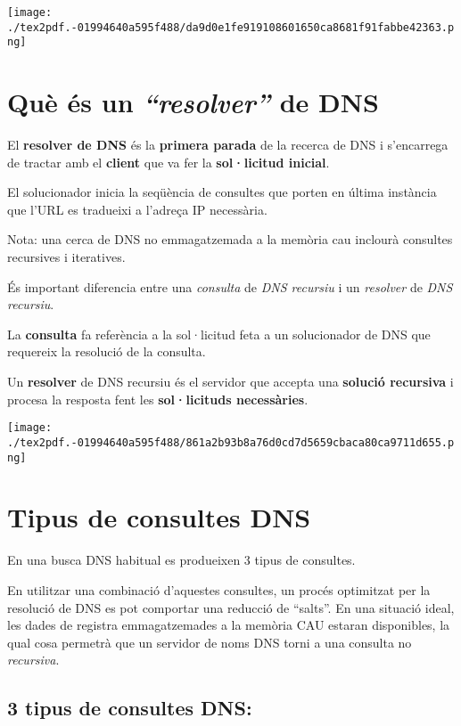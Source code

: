 \documentclass[]{article}
\begin{document}
\texttt{[image: ./tex2pdf.-01994640a595f488/da9d0e1fe919108601650ca8681f91fabbe42363.png]}

\hypertarget{quuxe8-uxe9s-un-resolver-de-dns}{%
\section{\texorpdfstring{\textbf{Què és un \emph{``resolver''} de
DNS}}{Què és un ``resolver'' de DNS}}\label{quuxe8-uxe9s-un-resolver-de-dns}}

El \textbf{resolver de DNS} és la \textbf{primera parada} de la recerca
de DNS i s'encarrega de tractar amb el \textbf{client} que va fer la
\textbf{sol·licitud inicial}.

El solucionador inicia la seqüència de consultes que porten en última
instància que l'URL es tradueixi a l'adreça IP necessària.

Nota: una cerca de DNS no emmagatzemada a la memòria cau inclourà
consultes recursives i iteratives.

És important diferencia entre una \emph{consulta} de \emph{DNS recursiu}
i un \emph{resolver} de \emph{DNS recursiu}.

La \textbf{consulta} fa referència a la sol·licitud feta a un
solucionador de DNS que requereix la resolució de la consulta.

Un \textbf{resolver} de DNS recursiu és el servidor que accepta una
\textbf{solució recursiva} i procesa la resposta fent les
\textbf{sol·licituds necessàries}.

\texttt{[image: ./tex2pdf.-01994640a595f488/861a2b93b8a76d0cd7d5659cbaca80ca9711d655.png]}

\hypertarget{tipus-de-consultes-dns}{%
\section{\texorpdfstring{\textbf{Tipus de consultes
DNS}}{Tipus de consultes DNS}}\label{tipus-de-consultes-dns}}

En una busca DNS habitual es produeixen 3 tipus de consultes.

En utilitzar una combinació d'aquestes consultes, un procés optimitzat
per la resolució de DNS es pot comportar una reducció de ``salts''. En
una situació ideal, les dades de registra emmagatzemades a la memòria
CAU estaran disponibles, la qual cosa permetrà que un servidor de noms
DNS torni a una consulta no \emph{recursiva}.

\hypertarget{tipus-de-consultes-dns-1}{%
\subsection{\texorpdfstring{\textbf{3 tipus de consultes
DNS:}}{3 tipus de consultes DNS:}}\label{tipus-de-consultes-dns-1}}
\end{document}
